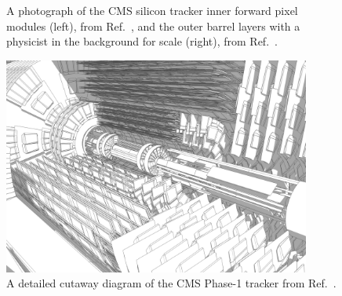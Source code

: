 \begin{figure}[htb]
    \centering
    \quad
    \caption[A photograph of the CMS silicon tracker inner forward pixel modules, from Ref.~\cite{Hoch:2017264}, and the outer barrel layers with a physicist in the background for scale, from Ref.~\cite{Maximilien:995912}]{
        A photograph of the CMS silicon tracker inner forward pixel modules (left), from Ref.~\cite{Hoch:2017264}, and the outer barrel layers with a physicist in the background for scale (right), from Ref.~\cite{Maximilien:995912}. 
    }
    \label{fig:cms_tracker_pictures}
\end{figure}

\begin{figure}[htb]
    \centering
    \includegraphics[width=0.9\textwidth,valign=c]{fig/cms/tracker_detailed.png}
    \caption{
        A detailed cutaway diagram of the CMS Phase-1 tracker from Ref.~\cite{Sakuma:2630160}. 
    }
    \label{fig:cms_tracker_layout}
\end{figure}

